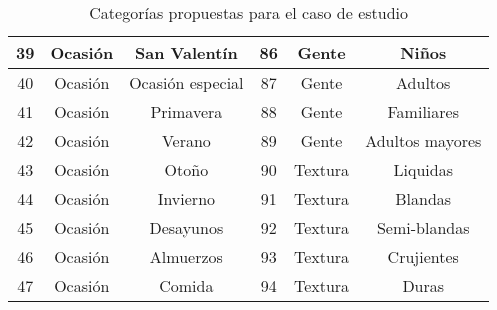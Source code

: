 \begin{table}
\begin{center}
\begin{tabular}{ | c | c | c | c | c | c |}
        39 & Ocasión & San Valentín  & 86 & Gente & Niños \\
        \midrule
        40 & Ocasión & Ocasión especial & 87 & Gente & Adultos \\
        \midrule
        41 & Ocasión & Primavera  & 88 & Gente & Familiares \\
        \midrule
        42 & Ocasión & Verano  & 89 & Gente & Adultos mayores \\
        \midrule
        43 & Ocasión & Otoño  & 90 & Textura & Liquidas \\
        \midrule
        44 & Ocasión & Invierno  & 91 & Textura & Blandas \\
        \midrule
        45 & Ocasión & Desayunos  & 92 & Textura & Semi-blandas \\
        \midrule
        46 & Ocasión & Almuerzos  & 93 & Textura & Crujientes \\
        \midrule
        47 & Ocasión   & Comida & 94 & Textura & Duras \\
        \bottomrule
      \end{tabular}
      \caption{Categorías propuestas para el caso de estudio}
      \label{table:categorias}
    \end{center}
  \end{table}

